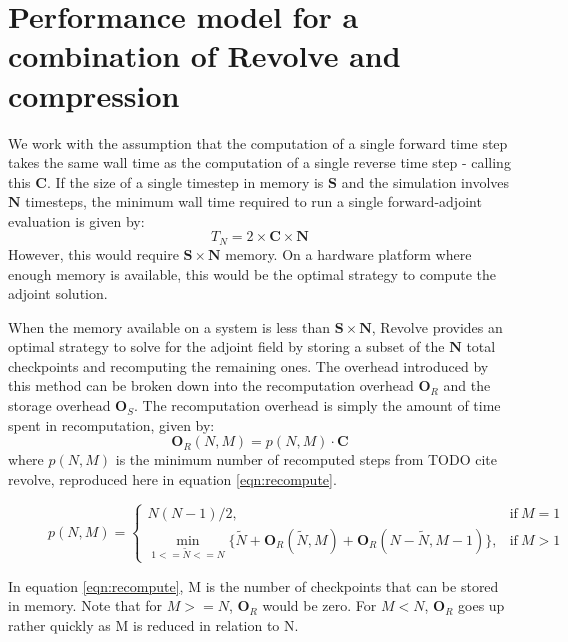 \documentclass[conference]{IEEEtran}
\begin{document}
\section{Performance model for a combination of Revolve and compression}
We work with the assumption that the computation of a single forward time step takes the same wall time
as the computation of a single reverse time step - calling this $\mathbf{C}$. If the size of a single 
timestep in memory is $\mathbf{S}$ and the simulation involves $\mathbf{N}$ timesteps, the minimum
wall time required to run a single forward-adjoint evaluation is given by:
\begin{equation}
T_N = 2 \times \mathbf{C} \times \mathbf{N}
\end{equation}
However, this would require $\mathbf{S} \times \mathbf{N}$ memory. On a hardware platform where enough memory
is available, this would be the optimal strategy to compute the adjoint solution. 

When the memory available on a system is less than $\mathbf{S} \times \mathbf{N}$, Revolve provides
an optimal strategy to solve for the adjoint field by storing a subset of the $\mathbf{N}$ total checkpoints
and recomputing the remaining ones. The overhead introduced by this method can be broken down into
the recomputation overhead $\mathbf{O}_R$ and the storage overhead $\mathbf{O}_S$. The recomputation
overhead is simply the amount of time spent in recomputation, given by:
\begin{equation}
\mathbf{O}_R(N, M) = p(N, M) \cdot \mathbf{C}
\end{equation}
where $p(N, M)$ is the minimum number of recomputed steps from TODO cite revolve, reproduced
here in equation \ref{eqn:recompute}.
\begin{figure}
\begin{equation}
p(N, M) = \begin{cases}
      N(N-1) /2, & \text{if}\ M=1 \\
      \min\limits_{1<=\widetilde{N}<=N} \{\widetilde{N} + \mathbf{O}_R(\widetilde{N}, M) + \mathbf{O}_R(N-\widetilde{N}, M-1)\}, & \text{if}\ M>1
    \end{cases}
    \label{eqn:recompute}
\end{equation}
\end{figure}
In equation \ref{eqn:recompute}, M is the number of checkpoints that can be stored in memory. Note that for $M >=N$, $\mathbf{O}_R$
would be zero. For $M < N$, $\mathbf{O}_R$ goes up rather quickly as M is reduced in relation to N. 
\end{document}
